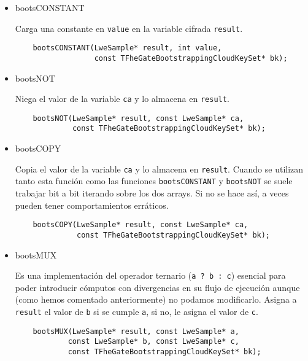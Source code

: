 \begin{itemize}

  \item bootsCONSTANT

  Carga una constante en \verb|value| en la variable cifrada \verb|result|.

  \begin{verbatim}
    bootsCONSTANT(LweSample* result, int value,
                  const TFheGateBootstrappingCloudKeySet* bk);
  \end{verbatim}

  \item bootsNOT

  Niega el valor de la variable \verb|ca| y lo almacena en \verb|result|.

  \begin{verbatim}
    bootsNOT(LweSample* result, const LweSample* ca,
             const TFheGateBootstrappingCloudKeySet* bk);
  \end{verbatim}

  \item bootsCOPY

  Copia el valor de la variable \verb|ca| y lo almacena en \verb|result|. Cuando se utilizan tanto esta función como las funciones \verb|bootsCONSTANT|  y \verb|bootsNOT| se suele trabajar bit a bit iterando sobre los dos arrays. Si no se hace así, a veces pueden tener comportamientos erráticos.

  \begin{verbatim}
    bootsCOPY(LweSample* result, const LweSample* ca,
              const TFheGateBootstrappingCloudKeySet* bk);
  \end{verbatim}

  \item bootsMUX

  Es una implementación del operador ternario (\verb|a ? b : c|) esencial para poder introducir cómputos con divergencias en su flujo de ejecución aunque (como hemos comentado anteriormente) no podamos modificarlo. Asigna a \verb|result| el valor de \verb|b| si se cumple \verb|a|, si no, le asigna el valor de \verb|c|.

  \begin{verbatim}
    bootsMUX(LweSample* result, const LweSample* a,
            const LweSample* b, const LweSample* c,
            const TFheGateBootstrappingCloudKeySet* bk);
  \end{verbatim}


\end{itemize}

